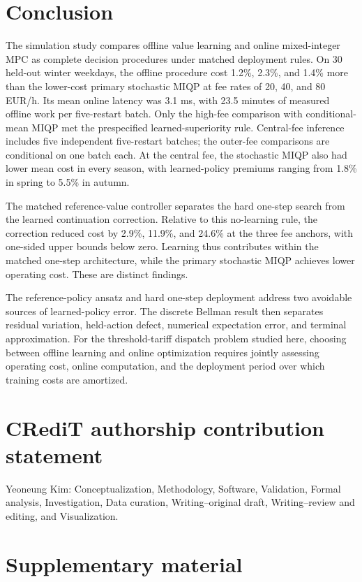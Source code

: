 \documentclass[preprint,11pt]{elsarticle}
\theoremstyle{plain}
\theoremstyle{remark}
\begin{document}
\section{Conclusion}\label{sec:conclusion}

The simulation study compares offline value learning and online mixed-integer
MPC as complete decision procedures under matched deployment rules. On 30 held-out winter
weekdays, the offline procedure cost 1.2\%, 2.3\%, and 1.4\% more than the
lower-cost primary stochastic MIQP at fee rates of 20, 40, and 80 EUR/h.
Its mean online latency was 3.1 ms, with 23.5 minutes of measured offline
work per five-restart batch. Only the high-fee comparison with conditional-mean
MIQP met the prespecified learned-superiority rule. Central-fee inference
includes five independent five-restart batches; the outer-fee comparisons
are conditional on one batch each. At the central fee, the stochastic MIQP
also had lower mean cost in every season, with learned-policy premiums
ranging from 1.8\% in spring to 5.5\% in autumn.

The matched reference-value controller separates the hard one-step search
from the learned continuation correction. Relative to this no-learning rule,
the correction reduced cost by 2.9\%, 11.9\%, and 24.6\% at the three fee
anchors, with one-sided upper bounds below zero. Learning thus contributes
within the matched one-step architecture, while the primary stochastic
MIQP achieves lower operating cost. These are distinct findings.

The reference-policy ansatz and hard one-step deployment address two avoidable
sources of learned-policy error. The discrete Bellman result then separates
residual variation, held-action defect, numerical expectation error, and
terminal approximation. For the threshold-tariff dispatch problem studied
here, choosing between offline learning and online optimization requires
jointly assessing operating cost, online computation, and the deployment
period over which training costs are amortized.

\section*{CRediT authorship contribution statement}

Yeoneung Kim: Conceptualization, Methodology, Software, Validation, Formal
analysis, Investigation, Data curation, Writing--original draft,
Writing--review and editing, and Visualization.

\section*{Supplementary material}
\end{document}
